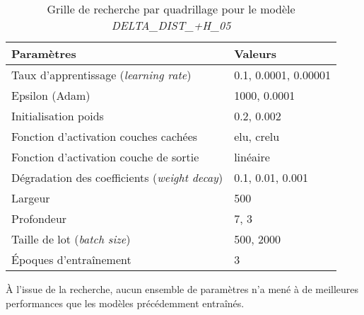 \begin{table}
	\centering
	
	\begin{tabular}{|l|l|}
		\hline
		\textbf{Paramètres} & \textbf{Valeurs} \\ \hline 
		Taux d'apprentissage (\textit{learning rate}) & 0.1, 0.0001, 0.00001 \\ \hline
		Epsilon (Adam) & 1000, 0.0001 \\ \hline
		Initialisation poids & 0.2, 0.002 \\ \hline
		Fonction d'activation couches cachées & elu, crelu \\ \hline
		Fonction d'activation couche de sortie & linéaire \\ \hline
		Dégradation des coefficients (\textit{weight decay}) & 0.1, 0.01, 0.001 \\ \hline
		Largeur & 500 \\ \hline
		Profondeur & 7, 3 \\ \hline
		Taille de lot (\textit{batch size}) & 500, 2000\\ \hline
		Époques d'entraînement & 3 \\ \hline
		
	\end{tabular}		
	
	\caption{Grille de recherche par quadrillage pour le modèle \emph{DELTA\_DIST\_+H\_05}}
	\label{t_grille_delta_dist}
\end{table}

\par À l'issue de la recherche, aucun ensemble de paramètres n'a mené à de meilleures performances que les modèles précédemment entraînés.
